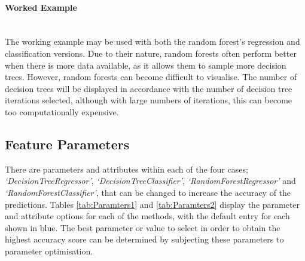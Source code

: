 \documentclass[../thesis.tex]{subfiles}
\begin{document}
\paragraph{Worked Example}\\
The working example may be used with both the random forest's regression and classification versions. Due to their nature, random forests often perform better when there is more data available, as it allows them to sample more decision trees. However, random forests can become difficult to visualise. The number of decision trees will be displayed in accordance with the number of decision tree iterations selected, although with large numbers of iterations, this can become too computationally expensive.

\subsection{Feature Parameters}
There are parameters and attributes within each of the four cases; \textit{`DecisionTreeRegressor'}, \textit{`DecisionTreeClassifier'}, \textit{`RandomForestRegressor'} and \textit{`RandomForestClassifier'}, that can be changed to increase the accuracy of the predictions.
Tables \ref{tab:Paramters1} and \ref{tab:Paramters2} display the parameter and attribute options for each of the methods, with the default entry for each shown in \textcolor{black}{blue}.
The best parameter or value to select in order to obtain the highest accuracy score can be determined by subjecting these parameters to parameter optimisation.
\end{document}
